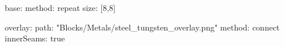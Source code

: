 base:
  method: repeat
  size: [8,8]
  
overlay:
  path: "Blocks/Metals/steel_tungsten_overlay.png"
  method: connect
  innerSeams: true